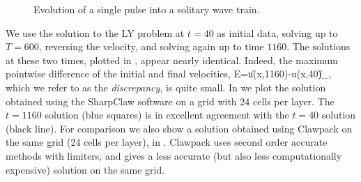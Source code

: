 \begin{figure}
\centerline{
}
\caption{Evolution of a single pulse into a solitary wave train. \label{fig:stego}}
\end{figure}


We use the solution to the LY problem at $t=40$ as
initial data, solving up to $T=600$, reversing the velocity, and solving again
up to time $1160$.  
The solutions at these two times,
plotted in , appear nearly identical.
Indeed, the maximum pointwise difference of the
initial and final velocities,
\be \label{eq:discrepancy}
E=\|u(x,1160)-u(x,40)\|_\infty,
\ee
which we refer to as the {\em discrepancy}, is quite small.
In  we plot the 
solution obtained using the SharpClaw software \cite{ketcheson2006} on a grid with 24 cells
per layer.  The $t=1160$ solution (blue squares) is in excellent agreement
with the $t=40$ solution (black line).  
For comparison we also show a solution obtained using Clawpack
on the same grid (24 cells per
layer), in .  Clawpack uses second order accurate methods
with limiters, and gives a less accurate 
(but also less computationally expensive) solution on the same grid.

